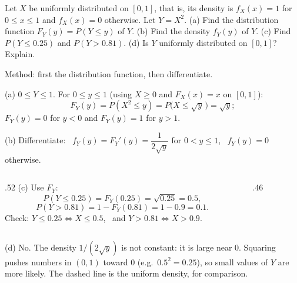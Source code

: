 
\begin{problem}
	Let $X$ be uniformly distributed on $[0,1]$, that is, its density is
	$f_X(x)=1$ for $0\le x\le1$ and $f_X(x)=0$ otherwise. Let $Y=X^2$.
	(a) Find the distribution function $F_Y(y)=P(Y\le y)$ of $Y$.
	(b) Find the density $f_Y(y)$ of $Y$.
	(c) Find $P(Y\le0.25)$ and $P(Y>0.81)$.
	(d) Is $Y$ uniformly distributed on $[0,1]$? Explain.
\end{problem}

\begin{slides}
	\small
	\exstatement
	\pause
	\sol \alert{Method:} first the distribution function, then differentiate.
	\pause

	(a) $0\le Y\le1$. For $0\le y\le1$ (using $X\ge0$ and $F_X(x)=x$ on $[0,1]$):
	\[ F_Y(y)=P(X^2\le y)=P\big(X\le\sqrt y\,\big)=\sqrt y ; \]
	$F_Y(y)=0$ for $y<0$ and $F_Y(y)=1$ for $y>1$.
	\pause

	(b) Differentiate: \
	$f_Y(y)=F_Y'(y)=\dfrac{1}{2\sqrt y}$ for $0<y\le1$, \ $f_Y(y)=0$ otherwise.
\end{slides}

\begin{slides}
	\small
	\begin{columns}[T]
		\begin{column}{.52\textwidth}
			(c) Use $F_Y$:
			\[ P(Y\le0.25)=F_Y(0.25)=\sqrt{0.25}=0.5, \]
			\[ P(Y>0.81)=1-F_Y(0.81)=1-0.9=0.1. \]
			Check: $Y\le0.25 \iff X\le0.5$, \ and $Y>0.81\iff X>0.9$.
		\end{column}
		\begin{column}{.46\textwidth}
			\centering
		\end{column}
	\end{columns}
	\pause
	\medskip

	(d) \alert{No.} The density $1/(2\sqrt y)$ is not constant: it is large
	near 0. Squaring pushes numbers in $(0,1)$ toward 0
	(e.g.\ $0.5^2=0.25$), so small values of $Y$ are more likely.
	The dashed line is the uniform density, for comparison.
\end{slides}


